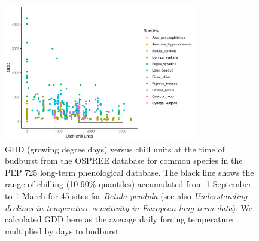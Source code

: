 \documentclass{article}
\begin{document}
\newpage
\begin{figure}[h!]
\centering
\noindent \includegraphics[width=0.75\textwidth]{..//..//analyses/bb_analysis/figures/gddbyutah_pepspp.pdf}
\caption{GDD (growing degree days) versus chill units at the time of budburst from the OSPREE database for common species in the PEP 725 long-term phenological database. The black line shows the range of chilling (10-90\% quantiles) accumulated from 1 September to 1 March for 45 sites for \emph{Betula pendula} (see also \emph{Understanding declines in temperature sensitivity in European long-term data}). We calculated GDD  here as the average daily forcing temperature multiplied by days to budburst. }
\label{fig:pepgddchill}
\end{figure}



\end{document}
